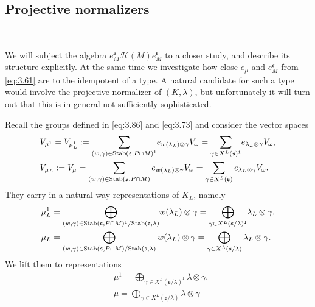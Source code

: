 \documentclass[11pt]{amsart}
\theoremstyle{definition}
\begin{document}
\subsection{Projective normalizers} \

We will subject the algebra $e^{{\mathfrak s}}_M {{\mathcal H}} (M) e^{{\mathfrak s}}_M$ to a closer study, and 
describe its structure explicitly. At the same time we investigate how close
$e_\mu$ and $e^{{\mathfrak s}}_M$ from \eqref{eq:3.61} are to the idempotent of a type. A natural 
candidate for such a type would involve the projective normalizer of $(K,\lambda)$, 
but unfortunately it will turn out that this is in general not sufficiently sophisticated.

Recall the groups defined in \eqref{eq:3.86} and \eqref{eq:3.73} and consider
the vector spaces \label{i:61} \label{i:62}
\begin{equation}\label{eq:4.40}
\begin{aligned}
& V_{\mu^1} = V_{\mu_L^1} := 
\sum_{(w,\gamma) \in {{\rm Stab}} ({{\mathfrak s}}, P \cap M)^1} \! e_{w(\lambda_L) \otimes \gamma} 
V_\omega = \sum_{\gamma \in X^L ({{\mathfrak s}})^1} \! e_{\lambda_L \otimes \gamma} V_\omega , \\
& V_{\mu_L} := V_\mu = 
\sum_{(w,\gamma) \in {{\rm Stab}} ({{\mathfrak s}}, P \cap M)} e_{w(\lambda_L) \otimes \gamma} V_\omega
= \sum_{\gamma \in X^L ({{\mathfrak s}})} e_{\lambda_L \otimes \gamma} V_\omega .
\end{aligned}
\end{equation}
They carry in a natural way representations of $K_L$, namely \label{i:36}
\begin{equation}\label{eq:4.m}
\begin{aligned}
& \mu_L^1 = \bigoplus_{(w,\gamma) \in {{\rm Stab}} ({{\mathfrak s}}, P \cap M)^1 / {{\rm Stab}} ({{\mathfrak s}},\lambda)} 
\! w(\lambda_L) \otimes \gamma
= \bigoplus_{\gamma \in X^L ({{\mathfrak s}} / \lambda)^1} \! \lambda_L \otimes \gamma , \\
& \mu_L  = \bigoplus_{(w,\gamma) \in {{\rm Stab}} ({{\mathfrak s}}, P \cap M) / {{\rm Stab}} ({{\mathfrak s}},\lambda)} 
w(\lambda_L) \otimes \gamma
= \bigoplus_{\gamma \in X^L ({{\mathfrak s}} / \lambda)} \lambda_L \otimes \gamma .
\end{aligned}
\end{equation}
We lift them to representations
\begin{equation}\label{eq:3.13}
\begin{aligned}
& \mu^1 = \bigoplus\nolimits_{\gamma \in X^L ({{\mathfrak s}} / \lambda)^1} \lambda \otimes \gamma , \\
& \mu  = \bigoplus\nolimits_{\gamma \in X^L ({{\mathfrak s}} / \lambda)} \lambda \otimes \gamma 
\end{aligned}
\end{equation}
\end{document}
